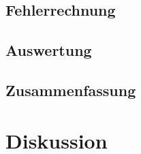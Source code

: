 \documentclass[12pt,a4paper]{article}
\begin{document}
\subsection*{Fehlerrechnung}

\subsection*{Auswertung}

\subsection*{Zusammenfassung}


\section*{Diskussion}
\end{document}
